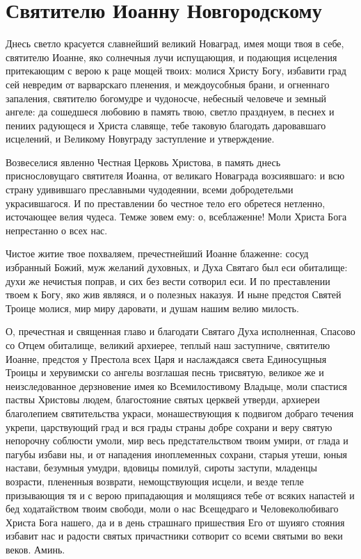 \section{Святителю Иоанну Новгородскому}\begin{mymulticols}


  Днесь светло красуется славнейший великий Новаград, имея мощи твоя в себе, святителю Иоанне, яко солнечныя лучи испущающия, и подающия исцеления притекающим с верою к раце мощей твоих: молися Христу Богу, избавити град сей невредим от варварскаго пленения, и междоусобныя брани, и огненнаго запаления, святителю богомудре и чудоносче, небесный человече и земный ангеле: да сошедшеся любовию в память твою, светло празднуем, в песнех и пениих радующеся и Христа славяще, тебе таковую благодать даровавшаго исцелений, и Bеликому Новуграду заступление и утверждение. 


  Возвеселися явленно Честная Церковь Христова, в память днесь приснословущаго святителя Иоанна, от великаго Новаграда возсиявшаго: и всю страну удивившаго преславными чудодеянии, всеми добродетельми украсившагося. И по преставлении бо честное тело его обретеся нетленно, источающее велия чудеса. Темже зовем ему: о, всеблаженне! Моли Христа Бога непрестанно о всех нас. 


 Чистое житие твое похваляем, пречестнейший Иоанне блаженне: сосуд избранный Божий, муж желаний духовных, и Духа Святаго был еси обиталище: духи же нечистыя поправ, и сих без вести сотворил еси. И по преставлении твоем к Богу, яко жив являяся, и о полезных наказуя. И ныне предстоя Святей Троице молися, мир миру даровати, и душам нашим велию милость.


О, пречестная и священная главо и благодати Святаго Духа исполненная, Спасово со Отцем обиталище, великий архиерее, теплый наш заступниче, святителю Иоанне, предстоя у Престола всех Царя и наслаждаяся света Единосущныя Троицы и херувимски со ангелы возглашая песнь трисвятую, великое же и неизследованное дерзновение имея ко Всемилостивому Владыце, моли спастися паствы Христовы людем, благостояние святых церквей утверди, архиереи благолепием святительства украси, монашествующия к подвигом добраго течения укрепи, царствующий град и вся грады страны добре сохрани и веру святую непорочну соблюсти умоли, мир весь предстательством твоим умири, от глада и пагубы избави ны, и от нападения иноплеменных сохрани, старыя утеши, юныя настави, безумныя умудри, вдовицы помилуй, сироты заступи, младенцы возрасти, плененныя возврати, немощствующия исцели, и везде тепле призывающия тя и с верою припадающия и молящияся тебе от всяких напастей и бед ходатайством твоим свободи, моли о нас Всещедраго и Человеколюбиваго Христа Бога нашего, да и в день страшнаго пришествия Его от шуияго стояния избавит нас и радости святых причастники сотворит со всеми святыми во веки веков. Аминь.

\end{mymulticols}

